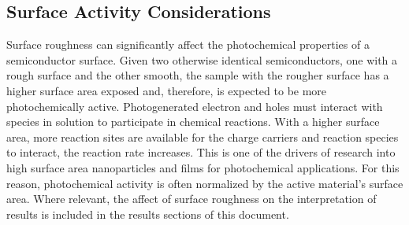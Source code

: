 \subsection{Surface Activity Considerations}
\label{subsec:background.surfaceactivity}


Surface roughness can significantly affect the photochemical properties of a semiconductor surface. Given two otherwise identical semiconductors, one with a rough surface and the other smooth, the sample with the rougher surface has a higher surface area exposed and, therefore, is expected to be more photochemically active. Photogenerated electron and holes must interact with species in solution to participate in chemical reactions. With a higher surface area, more reaction sites are available for the charge carriers and reaction species to interact, the reaction rate increases. This is one of the drivers of research into high surface area nanoparticles and films for photochemical applications.\cite{Kudo:2008fk} For this reason, photochemical activity is often normalized by the active material's surface area. Where relevant, the affect of surface roughness on the interpretation of results is included in the results sections of this document.

%
%
%
%
%
%




